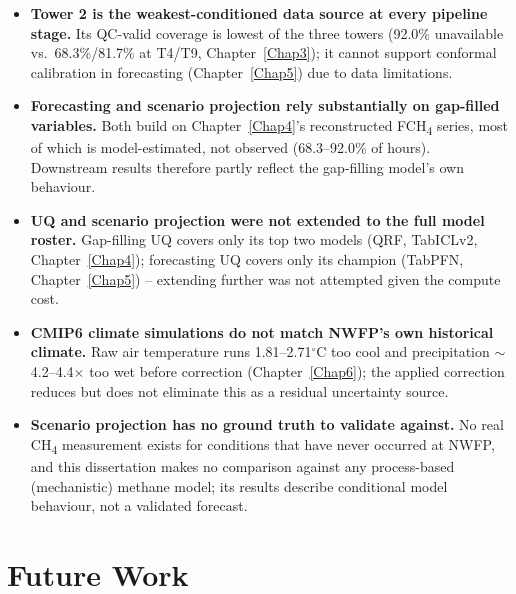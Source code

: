 \begin{itemize}
    \item \textbf{Tower 2 is the weakest-conditioned data source at every pipeline stage.} Its
    QC-valid coverage is lowest of the three towers (92.0\% unavailable vs.\ 68.3\%/81.7\% at
    T4/T9, Chapter~\ref{Chap3}); it cannot support conformal calibration in forecasting
    (Chapter~\ref{Chap5}) due to data limitations.
    \item \textbf{Forecasting and scenario projection rely substantially on gap-filled variables.} Both
    build on Chapter~\ref{Chap4}'s reconstructed FCH\textsubscript{4} series, most of which is
    model-estimated, not observed (68.3--92.0\% of hours). Downstream results therefore partly
    reflect the gap-filling model's own behaviour.
    \item \textbf{UQ and scenario projection were not extended to the full model roster.}
    Gap-filling UQ covers only its top two models (QRF, TabICLv2, Chapter~\ref{Chap4});
    forecasting UQ covers only its champion (TabPFN, Chapter~\ref{Chap5}) -- extending further was
    not attempted given the compute cost. 
    \item \textbf{CMIP6 climate simulations do not match NWFP's own historical climate.} Raw air
    temperature runs 1.81--2.71$^\circ$C too cool and precipitation $\sim$4.2--4.4$\times$ too wet
    before correction (Chapter~\ref{Chap6}); the applied correction reduces but does not eliminate
    this as a residual uncertainty source.
    \item \textbf{Scenario projection has no ground truth to validate against.} No real
    CH\textsubscript{4} measurement exists for conditions that have never occurred at NWFP, and
    this dissertation makes no comparison against any process-based (mechanistic) methane model; 
    its results describe conditional model behaviour, not a validated forecast.
\end{itemize}

\section{Future Work}

